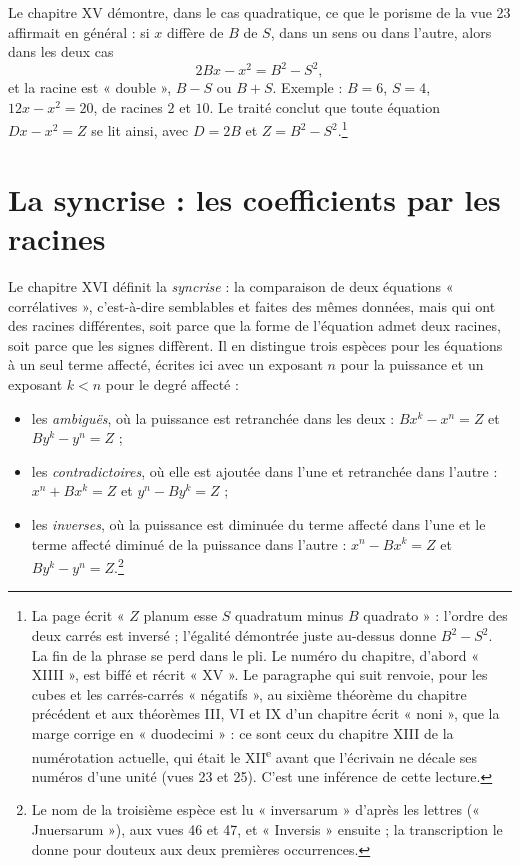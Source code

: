 \documentclass[11pt,a4paper]{article}
\begin{document}
Le chapitre XV démontre, dans le cas quadratique, ce que le porisme de la
vue 23 affirmait en général : si $x$ diffère de $B$ de $S$, dans un sens ou dans
l'autre, alors dans les deux cas
\[ 2Bx - x^2 = B^2 - S^2 , \]
et la racine est « double », $B - S$ ou $B + S$. Exemple : $B = 6$, $S = 4$,
$12x - x^2 = 20$, de racines $2$ et $10$. Le traité conclut que toute équation
$Dx - x^2 = Z$ se lit ainsi, avec $D = 2B$ et $Z = B^2 - S^2$.\footnote{La page écrit
« $Z$ planum esse $S$ quadratum minus $B$ quadrato » : l'ordre des deux carrés est
inversé ; l'égalité démontrée juste au-dessus donne $B^2 - S^2$. La fin de la phrase
se perd dans le pli. Le numéro du chapitre, d'abord « XIIII », est biffé et récrit « XV ». Le paragraphe
qui suit renvoie, pour les cubes et les carrés-carrés « négatifs », au sixième
théorème du chapitre précédent et aux théorèmes III, VI et IX d'un chapitre écrit
« noni », que la marge corrige en « duodecimi » : ce sont ceux du chapitre XIII
de la numérotation actuelle, qui était le XII\textsuperscript{e} avant que
l'écrivain ne décale ses numéros d'une unité (vues 23 et 25). C'est une
inférence de cette lecture.}

\section*{La syncrise : les coefficients par les racines}

Le chapitre XVI définit la \emph{syncrise} : la comparaison de deux équations
« corrélatives », c'est-à-dire semblables et faites des mêmes données, mais qui
ont des racines différentes, soit parce que la forme de l'équation admet deux
racines, soit parce que les signes diffèrent. Il en distingue trois espèces
pour les équations à un seul terme affecté, écrites ici avec un exposant
$n$ pour la puissance et un exposant $k < n$ pour le degré affecté :

\begin{itemize}
  \item les \emph{ambiguës}, où la puissance est retranchée dans les deux :
    $Bx^k - x^n = Z$ et $By^k - y^n = Z$ ;
  \item les \emph{contradictoires}, où elle est ajoutée dans l'une et retranchée
    dans l'autre : $x^n + Bx^k = Z$ et $y^n - By^k = Z$ ;
  \item les \emph{inverses}, où la puissance est diminuée du terme affecté dans
    l'une et le terme affecté diminué de la puissance dans l'autre :
    $x^n - Bx^k = Z$ et $By^k - y^n = Z$.\footnote{Le nom de la troisième espèce
    est lu « inversarum » d'après les lettres (« Jnuersarum »), aux vues 46 et
    47, et « Inversis » ensuite ; la transcription le donne pour douteux aux deux
    premières occurrences.}
\end{itemize}
\end{document}
